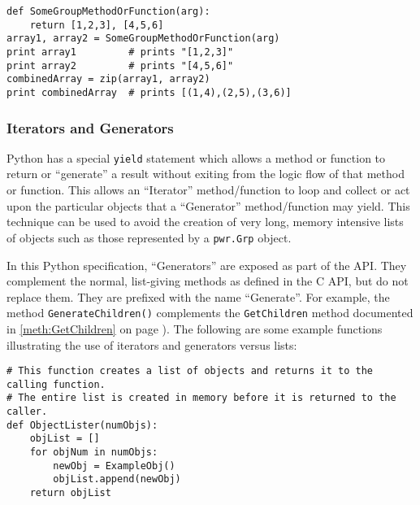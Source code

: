 \documentclass[12pt]{report} %
\begin{document}
\begin{appendices}
\begin{center}\begin{minipage}{.95\linewidth}\begin{lstlisting}
def SomeGroupMethodOrFunction(arg):
    return [1,2,3], [4,5,6]
array1, array2 = SomeGroupMethodOrFunction(arg)
print array1         # prints "[1,2,3]"
print array2         # prints "[4,5,6]"
combinedArray = zip(array1, array2)
print combinedArray  # prints [(1,4),(2,5),(3,6)]
\end{lstlisting}\end{minipage}\end{center}

\subsubsection{Iterators and Generators}\label{sec:PythonIteratorsGenerators}

Python has a special \texttt{yield} statement which allows a method or function to
return or ``generate'' a result without exiting from the logic flow of that
method or function. This allows an ``Iterator'' method/function to loop and
collect or act upon the particular objects that a ``Generator'' method/function
may yield. This technique can be used to avoid the creation of very long,
memory intensive lists of objects such as those represented by a
\texttt{pwr.Grp} object.

In this Python specification, ``Generators'' are exposed as part of the API.
They complement the normal, list-giving methods as defined in the C API, but do
not replace them. They are prefixed with the name ``Generate''. For example,
the method \texttt{GenerateChildren()} complements the \texttt{GetChildren}
method documented in \ref{meth:GetChildren} on page
\pageref{meth:GetChildren}). The following are some example functions
illustrating the use of iterators and generators versus lists:

\begin{center}\begin{minipage}{.95\linewidth}\begin{lstlisting}
# This function creates a list of objects and returns it to the calling function.
# The entire list is created in memory before it is returned to the caller.
def ObjectLister(numObjs):
    objList = []
    for objNum in numObjs:
        newObj = ExampleObj()
        objList.append(newObj)
    return objList


\end{lstlisting}
\end{minipage}
\end{center}
\end{appendices}
\end{document}
